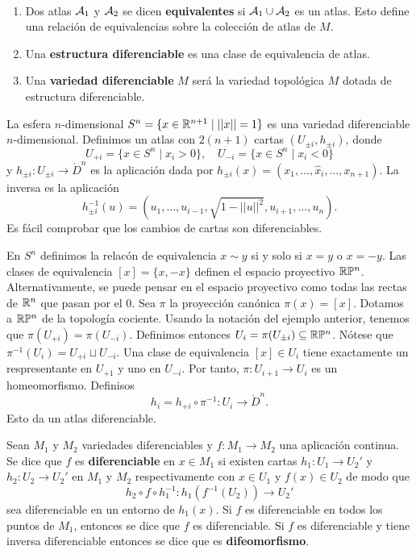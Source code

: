 \documentclass[CV.tex]{subfiles}
\begin{document}
\begin{defi}\
\begin{enumerate}
\item Dos atlas $\mathcal{A}_1$ y $\mathcal{A}_2$ se dicen \textbf{equivalentes} si $\mathcal{A}_1\cup\mathcal{A}_2$ es un atlas. Esto define una relación de equivalencias sobre la colección de atlas de $M$. 
\item Una \textbf{estructura diferenciable} es una clase de equivalencia de atlas.
\item Una \textbf{variedad diferenciable} $M$ será la variedad topológica $M$ dotada de estructura diferenciable.
\end{enumerate}
\end{defi}

\begin{ej}\label{8.5}
La esfera $n$-dimensional $S^n=\{x\in\mathbb{R}^{n+1}\mid ||x||=1\}$ es una variedad diferenciable $n$-dimensional. Definimos un atlas con $2(n+1)$ cartas $(U_{\pm i}, h_{\pm i})$, donde
\[
U_{+i}=\{x\in S^n\mid x_i>0\},\quad U_{-i}=\{x\in S^n\mid x_i<0\}
\]
y $h_{\pm i}:U_{\pm i}\to\mathring{D}^n$ es la aplicación dada por $h_{\pm i}(x)=(x_1,\dots, \hat{x}_i,\dots, x_{n+1})$. La inversa es la aplicación
\[
h_{\pm i}^{-1}(u)=(u_1,\dots, u_{i-1}, \sqrt{1-||u||^2}, u_{i+1},\dots, u_n).
\]
Es fácil comprobar que los cambios de cartas son diferenciables. 
\end{ej}

\begin{ej}
En $S^n$ definimos la relacón de equivalencia $x\sim y $ si y solo si $x=y$ o $x=-y$. Las clases de equivalencia $[x]=\{x,-x\}$ definen el espacio proyectivo $\mathbb{R}\mathbb{P}^n$. Alternativamente, se puede pensar en el espacio proyectivo como todas las rectas de $\mathbb{R}^n$ que pasan por el 0. Sea $\pi$ la proyección canónica $\pi(x)=[x]$. Dotamos a $\mathbb{R}\mathbb{P}^n$ de la topología cociente. Usando la notación del ejemplo anterior, tenemos que $\pi(U_{+i})=\pi(U_{-i})$. Definimos entonces $U_i=\pi(U_{\pm i})\subseteq\mathbb{R}\mathbb{P}^n$. Nótese que $\pi^{-1}(U_i)=U_{+i}\sqcup U_{-i}$. Una clase de equivalencia $[x]\in U_i$ tiene exactamente un respresentante en $U_{+1}$ y uno en $U_{-i}$. Por tanto, $\pi:U_{i+1}\to U_i$ es un homeomorfismo. Definisos
\[
h_i=h_{+i}\circ\pi^{-1}:U_i\to\mathring{D}^n.
\]
Esto da un atlas diferenciable. 
\end{ej}

\begin{defi}
Sean $M_1$ y $M_2$ variedades diferenciables y $f:M_1\to M_2$ una aplicación continua. Se dice que $f$ es \textbf{diferenciable} en $x\in M_1$ si existen cartas $h_1:U_1\to U_2'$ y $h_2:U_2\to U_2'$ en $M_1$ y $M_2$ respectivamente con $x\in U_1$ y $f(x)\in U_2$ de modo que
\[
h_2\circ f\circ h_1^{-1}:h_1(f^{-1}(U_2))\to U_2'
\]
sea diferenciable en un entorno de $h_1(x)$. Si $f$ es diferenciable en todos los puntos de $M_1$, entonces se dice que $f$ es diferenciable. Si $f$ es diferenciable y tiene inversa diferenciable entonces se dice que es \textbf{difeomorfismo}.
\end{defi}
\end{document}

